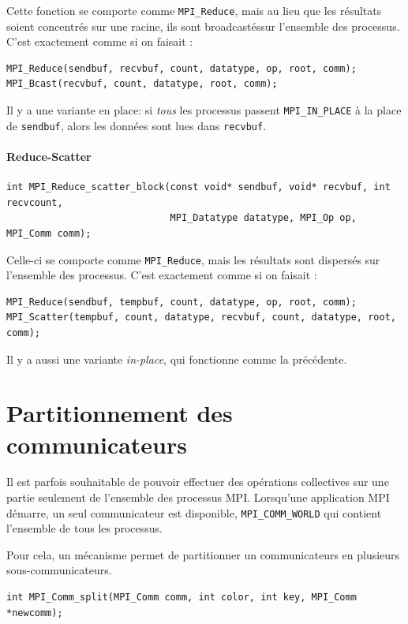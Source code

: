 Cette fonction se comporte comme \verb|MPI_Reduce|, mais au lieu que
les résultats soient concentrés sur une \og racine\fg, ils sont \og
broadcastés\fg sur l'ensemble des processus. C'est exactement comme si
on faisait :
\begin{verbatim}
MPI_Reduce(sendbuf, recvbuf, count, datatype, op, root, comm);
MPI_Bcast(recvbuf, count, datatype, root, comm);
\end{verbatim}

Il y a une variante \og en place\fg : si \emph{tous} les processus
passent \verb|MPI_IN_PLACE| à la place de \verb|sendbuf|, alors les
données sont lues dans \verb|recvbuf|.

\paragraph{Reduce-Scatter}
\begin{verbatim}
int MPI_Reduce_scatter_block(const void* sendbuf, void* recvbuf, int recvcount,
                             MPI_Datatype datatype, MPI_Op op, MPI_Comm comm);
\end{verbatim}

Celle-ci se comporte comme \verb|MPI_Reduce|, mais les résultats sont
dispersés sur l'ensemble des processus. C'est exactement comme si on
faisait :
\begin{verbatim}
MPI_Reduce(sendbuf, tempbuf, count, datatype, op, root, comm);
MPI_Scatter(tempbuf, count, datatype, recvbuf, count, datatype, root, comm);
\end{verbatim}

Il y a aussi une variante \textit{in-place}, qui fonctionne comme la précédente.

\section{Partitionnement des communicateurs}

Il est parfois souhaitable de pouvoir effectuer des opérations collectives sur
une partie seulement de l'ensemble des processus MPI. Lorsqu'une application MPI
démarre, un seul communicateur est disponible, \verb|MPI_COMM_WORLD| qui
contient l'ensemble de tous les processus.

Pour cela, un mécanisme permet de partitionner un communicateurs en plusieurs
sous-communicateurs.

\begin{verbatim}
int MPI_Comm_split(MPI_Comm comm, int color, int key, MPI_Comm *newcomm);
\end{verbatim}


